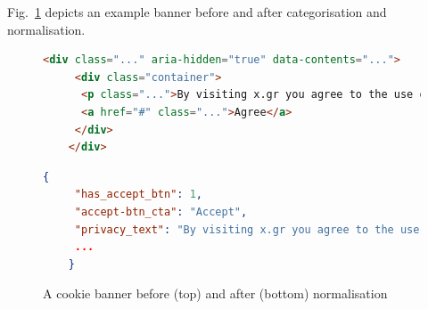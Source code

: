 Fig.~\ref{fig:html2json} depicts an example banner before and after categorisation and normalisation.


\begin{figure}[t]
    \centering
    \begin{lstlisting}[language=HTML, style=lst_style]
    <div class="..." aria-hidden="true" data-contents="...">
     <div class="container">
      <p class="...">By visiting x.gr you agree to the use of cookies.</p>
      <a href="#" class="...">Agree</a>
     </div>
    </div>
    \end{lstlisting}
    \begin{lstlisting}[language=json, style=lst_style]
    {
     "has_accept_btn": 1, 
     "accept-btn_cta": "Accept", 
     "privacy_text": "By visiting x.gr you agree to the use of cookies.", 
     ... 
    }
    \end{lstlisting}
    \caption{A cookie banner before (top) and after (bottom) normalisation}
    \label{fig:html2json}
\end{figure}